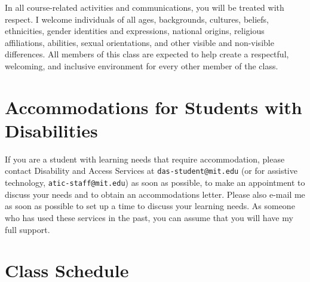 \documentclass[letterpaper]{inzane_syllabus} %
\begin{document}
In all course-related activities and communications, you will be treated with respect.
I welcome individuals of all ages, backgrounds, cultures, beliefs, ethnicities, gender identities and expressions, national origins, religious affiliations, abilities, sexual orientations, and other visible and non-visible differences.
All members of this class are expected to help create a respectful, welcoming, and inclusive environment for every other member of the class.

\vspace{0.5cm}
\section{Accommodations for Students with Disabilities}

If you are a student with learning needs that require accommodation, please contact Disability and Access Services at \texttt{das-student@mit.edu} (or for assistive technology, \texttt{atic-staff@mit.edu}) as soon as possible, to make an appointment to discuss your needs and to obtain an accommodations letter.
Please also e-mail me as soon as possible to set up a time to discuss your learning needs.
As someone who has used these services in the past, you can assume that you will have my full support.


\newpage
\makeFullPage
\section{Class Schedule}
\end{document}
